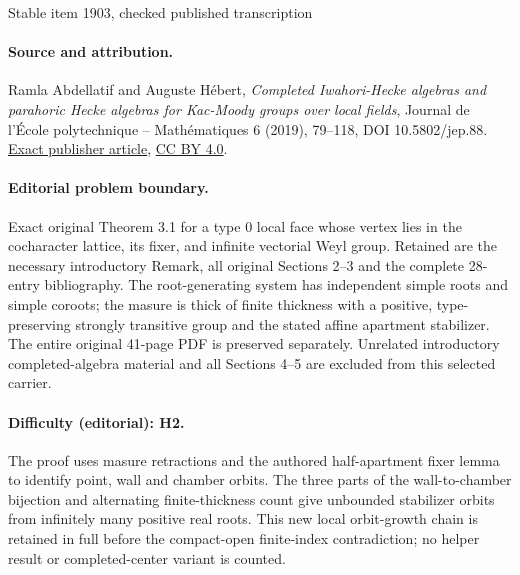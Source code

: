 \documentclass[11pt]{article}
\theoremstyle{definition}
\theoremstyle{remark}
\numberwithin{equation}{section}
\begin{document}
\begin{center}{\Large Stable item 1903, checked published transcription}\end{center}
\paragraph{Source and attribution.}
Ramla Abdellatif and Auguste Hébert, \emph{Completed Iwahori-Hecke algebras and parahoric Hecke algebras for Kac-Moody groups over local fields}, Journal de l’École polytechnique -- Mathématiques 6 (2019), 79--118, DOI 10.5802/jep.88. \href{https://jep.centre-mersenne.org/articles/10.5802/jep.88/}{Exact publisher article}, \href{https://creativecommons.org/licenses/by/4.0/}{CC BY 4.0}.
\paragraph{Editorial problem boundary.}
Exact original Theorem 3.1 for a type 0 local face whose vertex lies in the cocharacter lattice, its fixer, and infinite vectorial Weyl group. Retained are the necessary introductory Remark, all original Sections 2--3 and the complete 28-entry bibliography. The root-generating system has independent simple roots and simple coroots; the masure is thick of finite thickness with a positive, type-preserving strongly transitive group and the stated affine apartment stabilizer. The entire original 41-page PDF is preserved separately. Unrelated introductory completed-algebra material and all Sections 4--5 are excluded from this selected carrier.
\paragraph{Difficulty (editorial): H2.}
The proof uses masure retractions and the authored half-apartment fixer lemma to identify point, wall and chamber orbits. The three parts of the wall-to-chamber bijection and alternating finite-thickness count give unbounded stabilizer orbits from infinitely many positive real roots. This new local orbit-growth chain is retained in full before the compact-open finite-index contradiction; no helper result or completed-center variant is counted.
\end{document}

